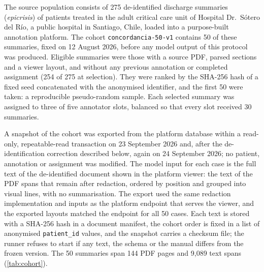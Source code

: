 The source population consists of 275 de-identified discharge summaries (\emph{epicrisis}) of patients
treated in the adult critical care unit of Hospital Dr.~Sótero del Río, a public hospital in Santiago,
Chile, loaded into a purpose-built annotation platform. The cohort \texttt{concordancia-50-v1} contains 50
of these summaries, fixed on 12 August 2026, before any model output of this protocol was produced. Eligible
summaries were those with a source PDF, parsed sections and a viewer layout, and without any previous
annotation or completed assignment (254 of 275 at selection). They were ranked by the SHA-256 hash of a fixed
seed concatenated with the anonymised identifier, and the first 50 were taken: a reproducible pseudo-random
sample. Each selected summary was assigned to three of five annotator slots, balanced so that every slot
received 30 summaries.

A snapshot of the cohort was exported from the platform database within a read-only, repeatable-read
transaction on 23 September 2026 and, after the de-identification correction described below, again on
24 September 2026; no patient, annotation or assignment was modified. The model
input for each case is the full text of the de-identified document shown in the platform viewer:
the text of the PDF spans that remain after redaction, ordered by position and grouped into visual
lines, with no summarisation. The export used the same redaction implementation and inputs as the
platform endpoint that serves the viewer, and the exported layouts matched the endpoint for all 50
cases. Each text is stored with a SHA-256 hash in a document manifest, the cohort order is fixed in a
list of anonymised \texttt{patient\_id} values, and the snapshot carries a checksum file; the runner
refuses to start if any text, the schema or the manual differs from the frozen version. The 50 summaries
span 144 PDF pages and 9{,}089 text spans (\cref{tab:cohort}).


